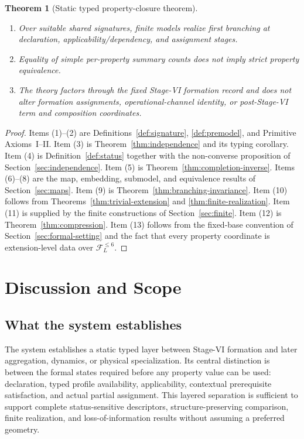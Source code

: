 \documentclass[11pt]{article}
\newcommand{\FVI}{\mathcal F_{L}^{\le 6}}
\newtheorem{theorem}{Theorem}[section]
\theoremstyle{definition}
\theoremstyle{remark}
\begin{document}
\begin{theorem}[Static typed property-closure theorem]
\begin{enumerate}[label=(\arabic*)]
\item Over suitable shared signatures, finite models realize first branching at declaration, applicability/dependency, and assignment stages.
\item Equality of simple per-property summary counts does not imply strict property equivalence.
\item The theory factors through the fixed Stage-VI formation record and does not alter formation assignments, operational-channel identity, or post-Stage-VI term and composition coordinates.
\end{enumerate}
\end{theorem}

\begin{proof}
Items (1)--(2) are Definitions~\ref{def:signature}, \ref{def:premodel}, and Primitive Axioms~I--II.
Item (3) is Theorem~\ref{thm:independence} and its typing corollary.
Item (4) is Definition~\ref{def:status} together with the non-converse proposition of Section~\ref{sec:independence}.
Item (5) is Theorem~\ref{thm:completion-inverse}.
Items (6)--(8) are the map, embedding, submodel, and equivalence results of Section~\ref{sec:maps}.
Item (9) is Theorem~\ref{thm:branching-invariance}.
Item (10) follows from Theorems~\ref{thm:trivial-extension} and \ref{thm:finite-realization}.
Item (11) is supplied by the finite constructions of Section~\ref{sec:finite}.
Item (12) is Theorem~\ref{thm:compression}.
Item (13) follows from the fixed-base convention of Section~\ref{sec:formal-setting} and the fact that every property coordinate is extension-level data over \(\FVI\).
\end{proof}

\section{Discussion and Scope}
\label{sec:discussion}

\subsection{What the system establishes}

The system establishes a static typed layer between Stage-VI formation and later aggregation, dynamics, or physical specialization.
Its central distinction is between the formal states required before any property value can be used: declaration, typed profile availability, applicability, contextual prerequisite satisfaction, and actual partial assignment.
This layered separation is sufficient to support complete status-sensitive descriptors, structure-preserving comparison, finite realization, and loss-of-information results without assuming a preferred geometry.
\end{document}
